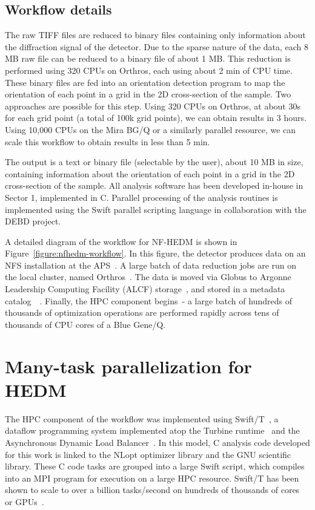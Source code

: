 \documentclass[conference,10pt]{IEEEtran}
\newcommand*\circled[1]{\tikz[baseline=(char.base)]{
  \node[shape=circle,draw,inner sep=2pt] (char) {#1};}}
\begin{document}
\subsection{Workflow details}

The raw TIFF files are reduced to binary files containing only
information about the diffraction signal of the detector. Due to the
sparse nature of the data, each 8 MB raw file can be reduced to a
binary file of about 1 MB. This reduction is performed using 320 CPUs
on Orthros, each using about 2 min of CPU time. These binary files are
fed into an orientation detection program to map the orientation of
each point in a grid in the 2D cross-section of the sample. Two
approaches are possible for this step.  Using 320 CPUs on Orthros, at
about 30s for each grid point (a total of 100k grid points), we can
obtain results in 3 hours.  Using 10,000 CPUs on the Mira BG/Q or a
similarly parallel resource, we can scale this workflow to obtain
results in less than 5 min.

The output is a text or binary file (selectable by the user), about 10
MB in size, containing information about the orientation of each point
in a grid in the 2D cross-section of the sample.  All analysis
software has been developed in-house in Sector 1, implemented in
C. Parallel processing of the analysis routines is implemented using
the Swift parallel scripting language in collaboration with the DEBD
project.

A detailed diagram of the workflow for NF-HEDM is shown in
Figure~\ref{figure:nfhedm-workflow}.  In this figure, the detector
produces data on an NFS installation at the APS~\circled{1}. A large
batch of data reduction jobs are run on the local cluster, named
Orthros~\circled{2}.  The data is moved via Globus to Argonne
Leadership Computing Facility (ALCF) storage~\circled{3}, and stored
in a metadata catalog~\circled{4}~\cite{Catalog_2014}.  Finally, the
HPC component begins~\circled{5}- a large batch of hundreds of
thousands of optimization operations are performed rapidly across tens
of thousands of CPU cores of a Blue Gene/Q.

\section{Many-task parallelization for HEDM}

The HPC component of the workflow was implemented using
Swift/T~\cite{SwiftT_2013}, a dataflow programming system implemented
atop the Turbine runtime~\cite{Turbine_2013} and the Asynchronous
Dynamic Load Balancer~\cite{ADLB_2010}.  In this model, C analysis
code developed for this work is linked to the NLopt optimizer library
and the GNU scientific library.  These C code tasks are grouped into a
large Swift script, which compiles into an MPI program for execution
on a large HPC resource.  Swift/T has been shown to scale to over a
billion tasks/second on hundreds of thousands of cores~\cite{STC_2014}
or GPUs~\cite{Krieder_2014}.
\end{document}
